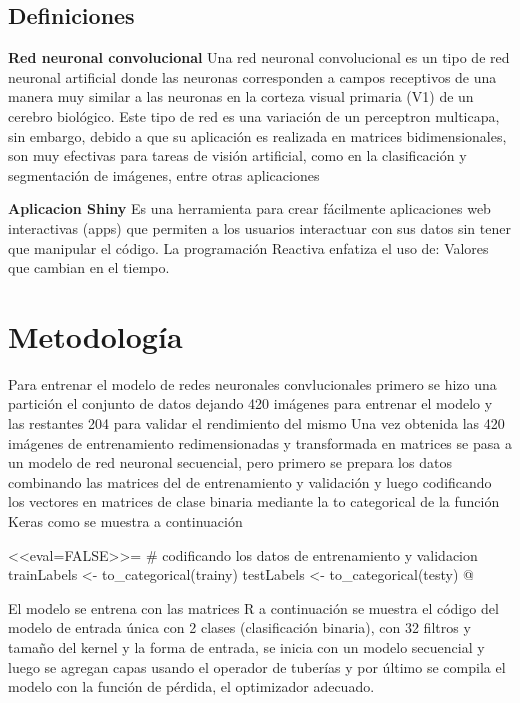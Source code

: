 \documentclass[11pt,twoside]{article}
\begin{document}
\subsection*{Definiciones}

\textbf{Red neuronal convolucional}
Una red neuronal convolucional es un tipo de red neuronal artificial donde las neuronas corresponden a campos receptivos de una manera muy similar a las neuronas en la corteza visual primaria (V1) de un cerebro biológico. Este tipo de red es una variación de un perceptron multicapa, sin embargo, debido a que su aplicación es realizada en matrices bidimensionales, son muy efectivas para tareas de visión artificial, como en la clasificación y segmentación de imágenes, entre otras aplicaciones 


\textbf{Aplicacion  Shiny}
Es una herramienta para crear fácilmente aplicaciones web interactivas (apps) que permiten a los usuarios interactuar con sus datos sin tener que manipular el código. La programación Reactiva enfatiza el uso de: Valores que cambian en el tiempo. 



\section*{Metodología}

Para entrenar el modelo de redes neuronales convlucionales primero se hizo una partición el conjunto de datos dejando 420 imágenes para entrenar el modelo y las restantes 204 para validar el rendimiento del mismo
Una vez obtenida las 420 imágenes de entrenamiento redimensionadas y transformada en matrices se pasa a un modelo de red neuronal secuencial,
pero primero se prepara los datos combinando las matrices del de entrenamiento y validación y luego codificando los vectores en matrices de clase binaria mediante la to categorical de la función Keras como se muestra a continuación


<<eval=FALSE>>=
# codificando los datos de entrenamiento y validacion 
trainLabels <- to_categorical(trainy)
testLabels <- to_categorical(testy)
@


El modelo se entrena con las matrices R a continuación se muestra el código del modelo de entrada única con 2 clases (clasificación binaria), con 32 filtros y tamaño del kernel y la forma de entrada, se inicia con un modelo secuencial y luego se agregan capas usando el operador de tuberías y por último se compila el modelo con la función de pérdida, el optimizador
adecuado.
\end{document}

